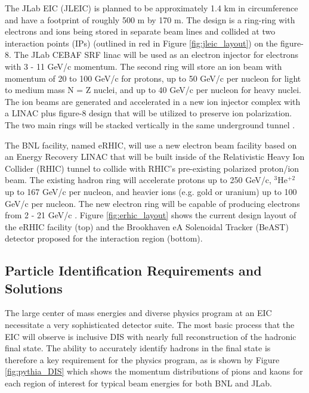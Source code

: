 The JLab EIC (JLEIC) is planned to be approximately 1.4 km in circumference and have a footprint of roughly 500 m by 170 m. The design is a ring-ring with electrons and ions being stored in separate beam lines and collided at two interaction points  (IPs) (outlined in red in Figure \ref{fig:jleic_layout}) on the figure-8. The JLab CEBAF SRF linac will be used as an electron injector for electrons with 3 - 11 GeV/c momentum. The second ring will store an ion beam with momentum of 20 to 100 GeV/c for protons, up to 50 GeV/c per nucleon for light to medium mass N = Z nuclei, and up to 40 GeV/c per nucleon for heavy nuclei. The ion beams are generated and accelerated in a new ion injector complex with a LINAC plus figure-8 design that will be utilized to preserve ion polarization. The two main rings will be stacked vertically in the same underground tunnel \cite{JLEICdesign}.

The BNL facility, named eRHIC, will use a new electron beam facility based on an Energy Recovery LINAC that will be built inside of the Relativistic Heavy Ion Collider (RHIC) tunnel to collide with RHIC's pre-existing polarized proton/ion beam. The existing hadron ring will accelerate protons up to 250 GeV/c, $^3$He$^{+2}$ up to 167 GeV/c per nucleon, and heavier ions (e.g. gold or uranium) up to 100 GeV/c per nucleon. The new electron ring will be capable of producing electrons from 2 - 21 GeV/c \cite{eRHICdesign}. Figure \ref{fig:erhic_layout} shows the current design layout of the eRHIC facility (top) and the Brookhaven eA Solenoidal Tracker (BeAST) detector proposed for the interaction region (bottom).

\subsection{Particle Identification Requirements and Solutions}
The large center of mass energies and diverse physics program at an EIC necessitate a very sophisticated detector suite. The most basic process that the EIC will observe is inclusive DIS with nearly full reconstruction of the hadronic final state. The ability to accurately identify hadrons in the final state is therefore a key requirement for the physics program, as is shown by Figure \ref{fig:pythia_DIS} which shows the momentum distributions of pions and kaons for each region of interest for typical beam energies for both BNL and JLab.

